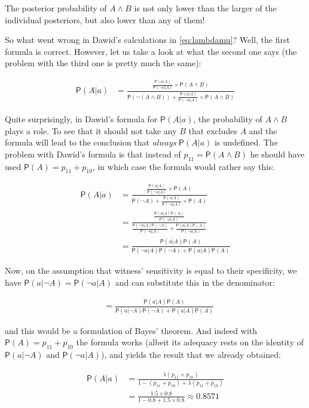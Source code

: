 \documentclass[10pt,dvipsnames,enabledeprecatedfontcommands]{scrartcl}
\newcommand{\n}{\neg}
\newcommand{\et}{\wedge}
\newcommand{\pr}[1]{\mathsf{P}(#1)}
\begin{document}
The posterior probability of \(A\et B\) is not only lower than the
larger of the individual posteriors, but also lower than any of them!

So what went wrong in Dawid's calculations in \eqref{eq:lambdamu}? Well,
the first formula is correct. However, let us take a look at what the
second one says (the problem with the third one is pretty much the
same):

\begin{align*}
\pr{A\vert a } & = \frac{\frac{\pr{a\vert A}}{\pr{\n a \vert A}}\times \pr{A\et B}}{\pr{\n (A\et B)}+ \frac{\pr{a\vert A}}{\pr{\n a \vert A}} \times \pr{A\et B}}
\end{align*}

Quite surprisingly, in Dawid's formula for \(\pr{A\vert a}\), the
probability of \(A\et B\) plays a role. To see that it should not take
any \(B\) that excludes \(A\) and the formula will lead to the
conclusion that \emph{always} \(\pr{A\vert a}\) is undefined. The
problem with Dawid's formula is that instead of \(p_{11}=\pr{A\et B}\)
he should have used \(\pr{A}=p_{11}+p_{10}\), in which case the formula
would rather say this:

\begin{align*}
\pr{A\vert a } & = \frac{\frac{\pr{a\vert A}}{\pr{\n a \vert A}}\times \pr{A}}{\pr{\n A}+ \frac{\pr{a\vert A}}{\pr{\n a \vert A}} \times \pr{A}}\\
& = \frac{\frac{\pr{a\vert A}\pr{A}}{\pr{\n a \vert A}}}{\frac{\pr{\n a\vert A}\pr{\n A}}{\pr{\n a\vert A}}+ \frac{\pr{a\vert A}\pr{A}}{\pr{\n a \vert A}}}\\
& = \frac{\pr{a\vert A}\pr{A}}{\pr{\n a\vert A}\pr{\n A} + \pr{a\vert A}\pr{A}}
\end{align*}

Now, on the assumption that witness' sensitivity is equal to their
specificity, we have \(\pr{a\vert \n A}=\pr{\n a \vert A}\) and can
substitute this in the denominator:

\begin{align*} & = \frac{\pr{a\vert A}\pr{A}}{\pr{ a\vert \n A}\pr{\n A} + \pr{a\vert A}\pr{A}}\end{align*}

and this would be a formulation of Bayes' theorem. And indeed with
\(\pr{A}=p_{11}+p_{10}\) the formula works (albeit its adequacy rests on
the identity of \(\pr{a\vert \n A}\) and \(\pr{\n a \vert A}\)), and
yields the result that we already obtained:

\begin{align*}
\pr{A\vert a} &= \frac{\lambda(p_{11}+p_{10})}{1-(p_{11}+p_{10})+\lambda(p_{11}+p_{10})}\\
&= \frac{1.5\times 0.8}{1- 0.8+1.5\times 0.8} \approx 0.8571
\end{align*}
\end{document}
